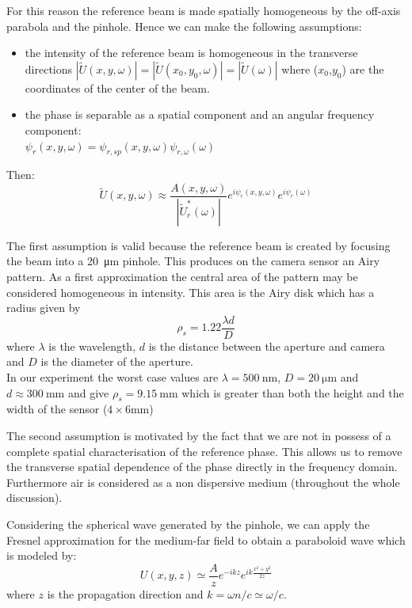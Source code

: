 \documentclass[12pt,a4paper,twoside]{article}
\begin{document}
For this reason the reference beam is made spatially homogeneous by the off-axis parabola and the pinhole.
Hence we can make the following assumptions:
\begin{itemize}
\item the intensity of the reference beam is homogeneous in the transverse directions $|\tilde{U}(x,y,\omega)|=|\tilde{U}(x_0,y_0,\omega)|=|\tilde{U}(\omega)|$ where ($x_0$,$y_0$) are the coordinates of the center of the beam.
\item the phase is separable as a spatial component and an angular frequency component:\\ $\psi_r(x,y,\omega) = \psi_{r,sp}(x,y,\omega)\psi_{r,\omega}(\omega)$
\end{itemize}
Then:
\begin{equation}
	\tilde{U}(x,y,\omega) \approx \frac{A(x,y,\omega)}{|\tilde{U}_r^*(\omega)|}e^{i\psi_r(x,y,\omega)}e^{i\psi_r(\omega)}
\end{equation}

The first assumption is valid because the reference beam is created by focusing the beam into a \SI{20}{\um} pinhole.
This produces on the camera sensor an Airy pattern.
As a first approximation the central area of the pattern may be considered homogeneous in intensity.
This area is the Airy disk which has a radius given by
$$\rho_s = 1.22 \frac{\lambda d}{D}$$
where $\lambda$ is the wavelength, $d$ is the distance between the aperture and camera and $D$ is the diameter of the aperture.\\
In our experiment the worst case values are $\lambda = \SI{500}{\nm}$, $D = \SI{20}{\um}$ and $d \approx \SI{300}{\mm}$ and give $\rho_s = \SI{9.15}{\mm}$ which is greater than both the height and the width of the sensor ($4 \times 6 \si{\mm}$)

\clearpage
The second assumption is motivated by the fact that we are not in possess of a complete spatial characterisation of the reference phase.
This allows us to remove the transverse spatial dependence of the phase directly in the frequency domain.
Furthermore air is considered as a non dispersive medium (throughout the whole discussion).

Considering the spherical wave generated by the pinhole, we can apply the Fresnel approximation for the medium-far field to obtain a paraboloid wave which is modeled by:
\begin{equation*}
U(x,y,z) \simeq \frac{A}{z}e^{-ikz}e^{ik\frac{x^2+y^2}{2z}}
\end{equation*}
where $z$ is the propagation direction and $k=\omega n/c \simeq \omega/c$.
\end{document}
